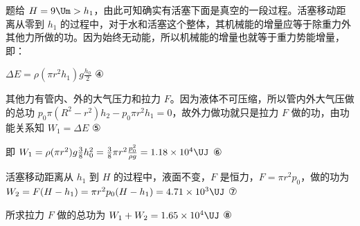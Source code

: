 \documentclass[\gkver]{gaokaozhenti}
\begin{document}
\begin{enumerate}
{题给 $H=9\Um>h_{1}$，由此可知确实有活塞下面是真空的一段过程。活塞移动距离从零到 $h_{1}$ 的过程中，对于水和活塞这个整体，其机械能的增量应等于除重力外其他力所做的功。因为始终无动能，所以机械能的增量也就等于重力势能增量，即：

$\Delta E=\rho(\pi r^{2}h_{1})g\frac{h_{0}}{2}$ ④

其他力有管内、外的大气压力和拉力 $F$。因为液体不可压缩，所以管内外大气压做的总功 $p_{0}\pi(R^{2}-r^{2})h_{2}-p_{0}\pi r^{2}h_{1}=0$，故外力做功就只是拉力 $F$ 做的功，由功能关系知 $W_{1}=\Delta E$ ⑤

即 $W_{1}=\rho(\pi r^{2})g\frac{3}{8}h_{0}^{2}=\frac{3}{8}\pi r^{2}\frac{p_{0}^{2}}{\rho g}=1.18\times10^{4}\UJ$ ⑥

活塞移动距离从 $h_{1}$ 到 $H$ 的过程中，液面不变，$F$ 是恒力，$F=\pi r^{2}p_{0}$，做的功为 $W_{2}=F(H-h_{1})=\pi r^{2}p_{0}(H-h_{1})=4.71\times10^{3}\UJ$ ⑦

所求拉力 $F$ 做的总功为 $W_{1}+W_{2}=1.65\times10^{4}\UJ$ ⑧

}

\end{enumerate}
\end{document}
